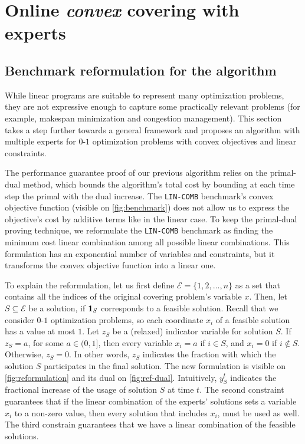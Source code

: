 
\section{Online \emph{convex} covering with experts} \label{sec:convex}

\subsection{Benchmark reformulation for the algorithm}

While linear programs are suitable to represent many optimization problems, they are not expressive enough to capture some practically relevant problems (for example, makespan minimization and congestion management). This section takes a step further towards a general framework and proposes an algorithm with multiple experts for $0$-$1$ optimization problems with convex objectives and linear constraints.

The performance guarantee proof of our previous algorithm relies on the primal-dual method, which bounds the algorithm's total cost by bounding at each time step the primal with the dual increase.
The \texttt{LIN-COMB} benchmark's convex objective function (visible on \cref{fig:benchmark}) does not allow us to express the objective's cost by additive terms like in the linear case. To keep the primal-dual proving technique, we reformulate the \texttt{LIN-COMB} benchmark as finding the minimum cost linear combination among all possible linear combinations. This formulation has an exponential number of variables and constraints, but it transforms the convex objective function into a linear one.

To explain the reformulation, let us first define $\mathcal{E} = \{1,2,\dots,n\}$ as a set that contains all the indices of the original covering problem's variable $x$. Then, let $S \subseteq \mathcal{E}$ be a solution, if $\mathbf{1}_{S}$ corresponds to a feasible solution. Recall that we consider $0$-$1$ optimization problems, so each coordinate $x_i$ of a feasible solution has a value at most $1$. Let $z_{S}$ be a (relaxed) indicator variable for solution $S$. If $z_{S} = a$, for some $a \in (0,1]$, then every variable $x_{i} = a$ if $i \in S$, and $x_{i} = 0$ if $i \notin S$. Otherwise, $z_S = 0$. In other words, $z_{S}$ indicates the fraction with which the solution $S$ participates in the final solution. The new formulation is visible on \cref{fig:reformulation} and its dual on \cref{fig:ref-dual}. Intuitively, $y_S^{t}$ indicates the fractional increase of the usage of solution $S$ at time $t$. The second constraint guarantees that if the linear combination of the experts' solutions sets a variable $x_i$ to a non-zero value, then every solution that includes $x_i$, must be used as well. The third constrain guarantees that we have a linear combination of the feasible solutions.

